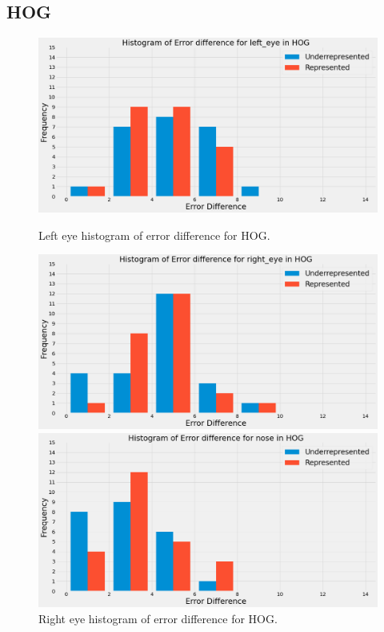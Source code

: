 \documentclass{l4proj}
\begin{document}
\subsection{HOG}
\begin{figure}[h!]
  \centering
  \begin{minipage}{0.49\textwidth}
    \includegraphics[width=\textwidth]{images/dlib_lefteye.png}
    \caption{Left eye histogram of error difference for HOG.}
    \label{dlib_lefteye}
  \end{minipage}
  \hfill
  \begin{minipage}{0.49\textwidth}
    \includegraphics[width=\textwidth]{images/dlib_righteye.png}
    \caption{Right eye histogram of error difference for HOG.}
    \label{dlib_righteye}
  \end{minipage}
  \hfill
  \begin{minipage}{0.51\textwidth}
    \includegraphics[width=\textwidth]{images/dlib_nose.png}

\end{minipage}
\end{figure}
\end{document}
